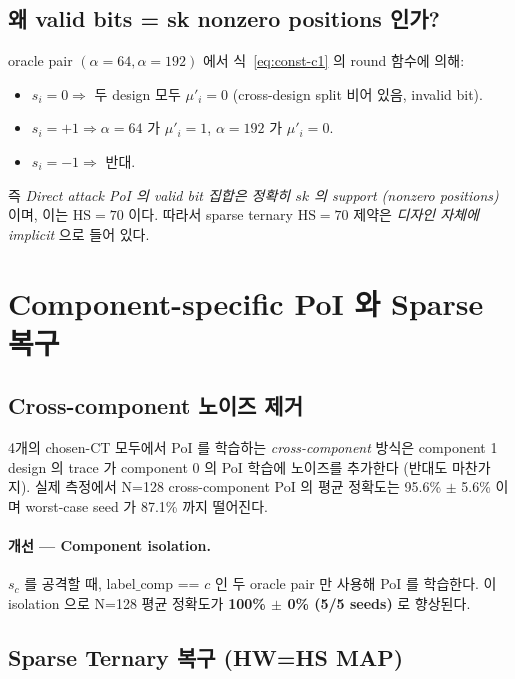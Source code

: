 \documentclass[11pt]{article}
\theoremstyle{plain}
\theoremstyle{definition}
\theoremstyle{remark}
\newcommand{\HS}{\mathrm{HS}}
\begin{document}
\subsection{왜 valid bits = sk nonzero positions 인가?}

oracle pair $(\alpha=64, \alpha=192)$ 에서 식~\eqref{eq:const-c1} 의 round
함수에 의해:
\begin{itemize}[leftmargin=*]
\item $s_i = 0 \Rightarrow$ 두 design 모두 $\mu'_i = 0$ (cross-design split 비어
   있음, invalid bit).
\item $s_i = +1 \Rightarrow \alpha=64$ 가 $\mu'_i = 1$, $\alpha=192$ 가 $\mu'_i = 0$.
\item $s_i = -1 \Rightarrow$ 반대.
\end{itemize}
즉 \emph{Direct attack PoI 의 valid bit 집합은 정확히 $sk$ 의 support
(nonzero positions)} 이며, 이는 $\HS = 70$ 이다. 따라서 sparse ternary
$\HS = 70$ 제약은 \emph{디자인 자체에 implicit} 으로 들어 있다.

\section{Component-specific PoI 와 Sparse 복구}
\label{sec:component}

\subsection{Cross-component 노이즈 제거}

4개의 chosen-CT 모두에서 PoI 를 학습하는 \emph{cross-component} 방식은
component 1 design 의 trace 가 component 0 의 PoI 학습에 노이즈를 추가한다
(반대도 마찬가지). 실제 측정에서 N=128 cross-component PoI 의 평균 정확도는
95.6\% $\pm$ 5.6\% 이며 worst-case seed 가 87.1\% 까지 떨어진다.

\paragraph{개선 — Component isolation.} $s_c$ 를 공격할 때, label$\_$comp == $c$
인 두 oracle pair 만 사용해 PoI 를 학습한다. 이 isolation 으로 N=128 평균
정확도가 \textbf{100\% $\pm$ 0\% (5/5 seeds)} 로 향상된다.

\subsection{Sparse Ternary 복구 (HW=HS MAP)}
\end{document}
